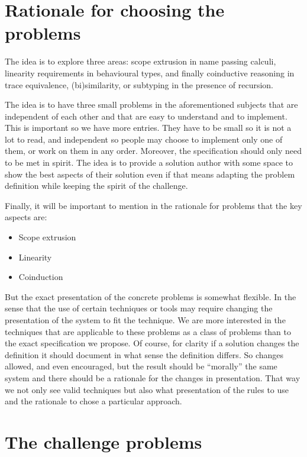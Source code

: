 \documentclass{article}
\begin{document}
\section{Rationale for choosing the problems}\label{sec:rationale}

 The idea is to explore three areas: scope
extrusion in name passing calculi, linearity requirements in
behavioural types, and finally coinductive reasoning in trace
equivalence, (bi)similarity, or subtyping in the presence of
recursion.

The idea is to have three small problems in the aforementioned
subjects that are independent of each other and that are easy to
understand and to implement. This is important so we have more
entries. They have to be small so it is not a lot to read, and
independent so people may choose to implement only one of them, or
work on them in any order. Moreover, the specification should only
need to be met in spirit. The idea is to provide a solution author
with some space to show the best aspects of their solution even if
that means adapting the problem definition while keeping the spirit of
the challenge.

Finally, it will be important to mention in the rationale for problems that
the key aspects are:
\begin{itemize}
\item Scope extrusion
\item Linearity
\item Coinduction
\end{itemize}

But the exact presentation of the concrete problems is somewhat
flexible. In the sense that the use of certain techniques or tools may
require changing the presentation of the system to fit the technique.
We are more interested in the techniques that are applicable to these
problems as a class of problems than to the exact specification we
propose. Of course, for clarity if a solution changes the definition
it should document in what sense the definition differs. So changes
allowed, and even encouraged, but the result should be ``morally'' the
same system and there should be a rationale for the changes in
presentation. That way we not only see valid techniques but also what
presentation of the rules to use and the rationale to chose a
particular approach.

\section{The challenge problems} \label{sec:problems}
\end{document}
